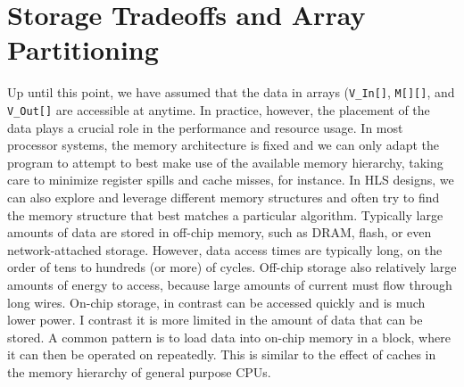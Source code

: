 
%

\section{Storage Tradeoffs and Array Partitioning}
\label{subsec:dft_array_partitioning}

Up until this point, we have assumed that the data in arrays (\lstinline|V_In[]|, \lstinline|M[][]|, and \lstinline|V_Out[]| are accessible at anytime.  In practice, however, the placement of the data plays a crucial role in the performance and resource usage. In most processor systems, the memory architecture is fixed and we can only adapt the program to attempt to best make use of the available memory hierarchy, taking care to minimize register spills and cache misses, for instance.  In HLS designs, we can also explore and leverage different memory structures and often try to find the memory structure that best matches a particular algorithm.  Typically large amounts of data are stored in off-chip memory, such as DRAM, flash, or even network-attached storage. However, data access times are typically long, on the order of tens to hundreds (or more) of cycles. Off-chip storage also relatively large amounts of energy to access, because large amounts of current must flow through long wires.  On-chip storage, in contrast can be accessed quickly and is much lower power.  I contrast it is more limited in the amount of data that can be stored.  A common pattern is to load data into on-chip memory in a block, where it can then be operated on repeatedly.  This is similar to the effect of caches in the memory hierarchy of general purpose CPUs.

